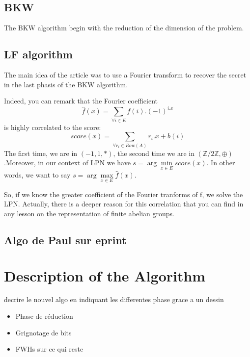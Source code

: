 \documentclass{llncs}		%
\newcommand{\argmin}{\arg\!\min}
\newcommand{\argmax}{\arg\!\max}
\begin{document}
\subsection{BKW}
The BKW algorithm begin with the reduction of the dimension of the problem.

\begin{framed}
\begin{algorithmic}
\EndFunction
\end{algorithmic}
\end{framed}





\subsection{LF algorithm}
The main idea of the article \cite{LF} was to use a Fourier transform to recover
the secret in the last phasis of the BKW algorithm.

Indeed, you can remark that the Fourier coefficient
$$\hat{f}(x)= \sum \limits_{\forall i \in E} f(i).(-1)^{i.x}$$
is highly correlated to the score: $$score(x)=\sum\limits_{\forall r_i\in
Row(A)}r_i.x+b(i)$$ The first time, we are in $({-1,1},*)$, the second time we
are in $(\mathbb{Z}/2\mathbb{Z},\oplus)$.Moreover, in our context of LPN we have
$s=\argmin\limits_{x \in E} score(x)$. In other words, we want to say $s = \argmax\limits_{x\in
E} \hat{f}(x)$.%


So, if we know the greater coefficient of the Fourier tranforms of f, we solve
the LPN. Actually, there is a deeper reason for this correlation that you can find in any
lesson on the representation of finite abelian groups. 

\subsection{Algo de Paul sur eprint}



\section{Description of the Algorithm}

decrire le nouvel algo en indiquant les differentes phase grace a un dessin
\begin{itemize}
\item Phase de réduction
\item Grignotage de bits
\item FWHs sur ce qui reste
\end{itemize}
\end{document}
